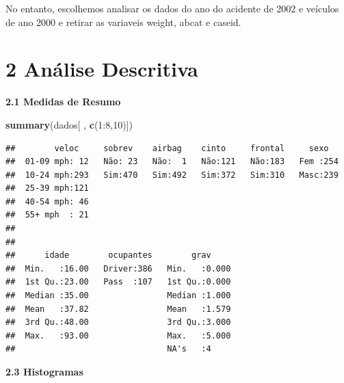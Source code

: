 \documentclass[]{article}
\newenvironment{Shaded}{\begin{snugshade}}{\end{snugshade}}
\newcommand{\KeywordTok}[1]{\textcolor[rgb]{0.13,0.29,0.53}{\textbf{{#1}}}}
\newcommand{\DataTypeTok}[1]{\textcolor[rgb]{0.13,0.29,0.53}{{#1}}}
\newcommand{\DecValTok}[1]{\textcolor[rgb]{0.00,0.00,0.81}{{#1}}}
\newcommand{\StringTok}[1]{\textcolor[rgb]{0.31,0.60,0.02}{{#1}}}
\newcommand{\NormalTok}[1]{{#1}}
\begin{document}
No entanto, escolhemos analisar os dados do ano do acidente de 2002 e
veículos de ano 2000 e retirar as variaveis weight, abcat e caseid.

\section{2 Análise Descritiva}\label{analise-descritiva}

\textbf{2.1 Medidas de Resumo}

\begin{Shaded}
\begin{Highlighting}[]
\KeywordTok{summary}\NormalTok{(dados[ , }\KeywordTok{c}\NormalTok{(}\DecValTok{1}\NormalTok{:}\DecValTok{8}\NormalTok{,}\DecValTok{10}\NormalTok{)])}
\end{Highlighting}
\end{Shaded}

\begin{verbatim}
##        veloc     sobrev    airbag    cinto     frontal     sexo    
##  01-09 mph: 12   Não: 23   Não:  1   Não:121   Não:183   Fem :254  
##  10-24 mph:293   Sim:470   Sim:492   Sim:372   Sim:310   Masc:239  
##  25-39 mph:121                                                     
##  40-54 mph: 46                                                     
##  55+ mph  : 21                                                     
##                                                                    
##                                                                    
##      idade        ocupantes        grav      
##  Min.   :16.00   Driver:386   Min.   :0.000  
##  1st Qu.:23.00   Pass  :107   1st Qu.:0.000  
##  Median :35.00                Median :1.000  
##  Mean   :37.82                Mean   :1.579  
##  3rd Qu.:48.00                3rd Qu.:3.000  
##  Max.   :93.00                Max.   :5.000  
##                               NA's   :4
\end{verbatim}

\textbf{2.3 Histogramas}

\begin{Shaded}
\end{Shaded}
\end{document}
